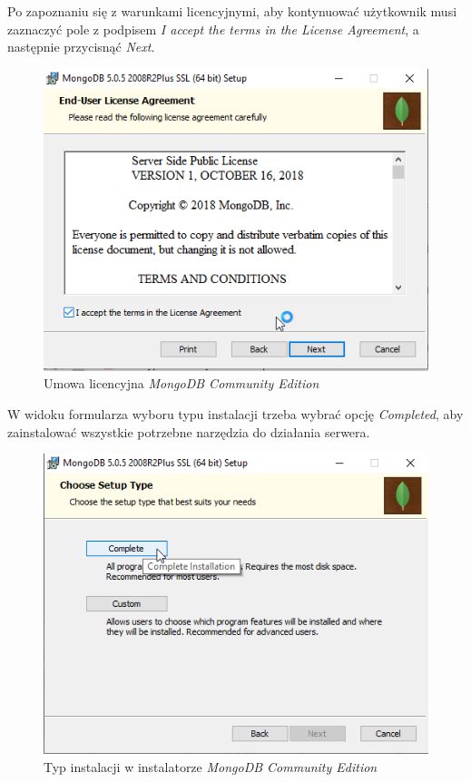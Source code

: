 \documentclass[a4paper,twoside,12pt]{book}
\begin{document}
Po zapoznaniu się z warunkami licencyjnymi, aby kontynuować użytkownik musi zaznaczyć pole z podpisem \textit{I accept the terms in the License Agreement}, a następnie przycisnąć \textit{Next}.
\FloatBarrier
\begin{figure}[H]
	\centering
	\includegraphics[width=0.7\linewidth]{../zrzuty_ekranu/instalcja_mongodb/mongodb2}
	\caption{Umowa licencyjna \textit{MongoDB Community Edition}}
	\label{fig:mongodb2}
\end{figure}
\afterpage{\clearpage}
\FloatBarrier

W widoku formularza wyboru typu instalacji trzeba wybrać opcję \textit{Completed}, aby zainstalować wszystkie potrzebne narzędzia do działania serwera.
\FloatBarrier
\begin{figure}[H]
	\centering
	\includegraphics[width=0.7\linewidth]{../zrzuty_ekranu/instalcja_mongodb/mongodb3}
	\caption{Typ instalacji w instalatorze \textit{MongoDB Community Edition}}
	\label{fig:mongodb3}
\end{figure}
\afterpage{\clearpage}
\FloatBarrier
\end{document}
